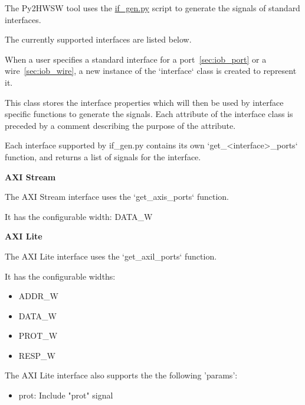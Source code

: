 %

%
%

The Py2HWSW tool uses the \href{https://github.com/IObundle/py2hwsw/blob/main/py2hwsw/scripts/if_gen.py}{if\_gen.py} script to generate the signals of standard interfaces.

The currently supported interfaces are listed below.


When a user specifies a standard interface for a port~\ref{sec:iob_port} or a wire~\ref{sec:iob_wire}, a new instance of the `interface` class is created to represent it.


This class stores the interface properties which will then be used by interface specific functions to generate the signals.
Each attribute of the interface class is preceded by a comment describing the purpose of the attribute.

Each interface supported by if\_gen.py contains its own `get\_\textless interface\textgreater\_ports` function, and returns a list of signals for the interface.

%
%
\clearpage
\large\textbf{AXI Stream}

The AXI Stream interface uses the `get\_axis\_ports` function.


It has the configurable width: DATA\_W

%
%
\clearpage
\large\textbf{AXI Lite}

The AXI Lite interface uses the `get\_axil\_ports` function.


It has the configurable widths: 
\begin{itemize}
  \item ADDR\_W
  \item DATA\_W
  \item PROT\_W
  \item RESP\_W
\end{itemize}

The AXI Lite interface also supports the the following 'params':
\begin{itemize}
  \item prot: Include "prot" signal
\end{itemize}

